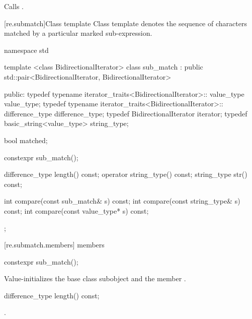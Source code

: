 \begin{itemdescr}
\pnum\effects  Calls .
\end{itemdescr}

[re.submatch]{Class template }
\pnum
{}%
Class template  denotes the sequence of characters matched
by a particular marked sub-expression.

\begin{codeblock}
namespace std {
  template <class BidirectionalIterator>
  class sub_match : public std::pair<BidirectionalIterator, BidirectionalIterator> {
  public:
     typedef typename iterator_traits<BidirectionalIterator>::
       value_type                                               value_type;
     typedef typename iterator_traits<BidirectionalIterator>::
       difference_type                                          difference_type;
     typedef BidirectionalIterator                              iterator;
     typedef basic_string<value_type>                           string_type;

     bool matched;

     constexpr sub_match();

     difference_type length() const;
     operator string_type() const;
     string_type str() const;

     int compare(const sub_match& s) const;
     int compare(const string_type& s) const;
     int compare(const value_type* s) const;
  }; 
}
\end{codeblock}


[re.submatch.members]{ members}

%
\begin{itemdecl}
constexpr sub_match();
\end{itemdecl}

\begin{itemdescr}
\pnum
\effects Value-initializes the  base class subobject and the member
.
\end{itemdescr}

%
%
\begin{itemdecl}
difference_type length() const;
\end{itemdecl}

\begin{itemdescr}
\pnum\returns  {}.
\end{itemdescr}

